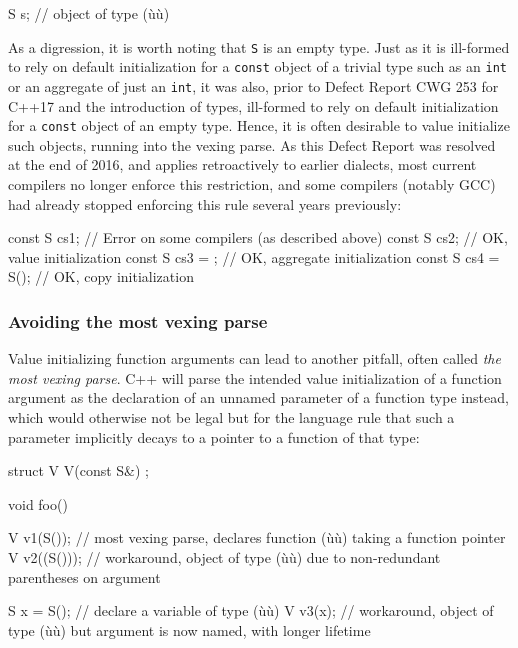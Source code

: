 \begin{emcppslisting}[emcppsbatch=e17]
S s{};  // object of type (ù{}ù)
\end{emcppslisting}
    
\noindent As a digression, it is worth noting that \lstinline!S! is an empty type.
Just as it is ill-formed to rely on default initialization for a
\lstinline!const! object of a trivial type such as an \lstinline!int! or an
aggregate of just an \lstinline!int!, it was also, prior to Defect Report
CWG 253 for C++17 and the introduction of
 types, ill-formed to rely on
default initialization for a \lstinline!const! object of an empty type.
Hence, it is often desirable to value initialize such objects, running
into the vexing parse. As this Defect Report was resolved at the end of
2016, and applies retroactively to earlier dialects, most current
compilers no longer enforce this restriction, and some compilers
(notably GCC) had already stopped enforcing this rule several years
previously:

\begin{emcppslisting}[emcppsbatch=e17]
const S cs1;        // Error on some compilers (as described above)
const S cs2{};      // OK, value initialization
const S cs3 = {};   // OK, aggregate initialization
const S cs4 = S();  // OK, copy initialization
\end{emcppslisting}
    

\subsubsection[Avoiding the most vexing parse]{Avoiding the most vexing parse}\label{avoiding-the-most-vexing-parse}

Value initializing function arguments can lead to another pitfall, often
called \emph{the most vexing parse}. C++ will parse the intended value
initialization of a function argument as the declaration of an unnamed
parameter of a function type instead, which would otherwise not be legal
but for the language rule that such a parameter implicitly decays to a
pointer to a function of that type:

\begin{emcppslisting}[emcppsbatch=e17]
struct V { V(const S&) { } };

void foo()
{
    V v1(S());    // most vexing parse, declares function (ù{}ù) taking a function pointer
    V v2((S()));  // workaround, object of type (ù{}ù) due to non-redundant parentheses on argument

    S x = S();    // declare a variable of type (ù{}ù)
    V v3(x);      // workaround, object of type (ù{}ù) but argument is now named, with longer lifetime
}
\end{emcppslisting}
    

